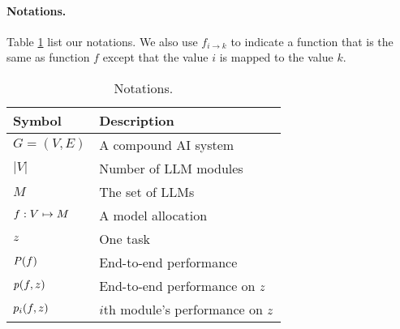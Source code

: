 \paragraph{Notations.} Table \ref{tab:deluxeagent:notation} list our notations. We also use $f_{i\rightarrow k}$ to indicate a function that is the same as function $f$ except that the value $i$ is mapped to the value $k$. 


\begin{table}[ht!]
\centering
\caption{Notations. 
}
\begin{tabular}{@{}ll@{}}
\toprule
\textbf{Symbol} & \textbf{Description} \\ \midrule
$G = (V, E)$   & A compound AI system \\ \midrule
$|V|$            & Number of LLM modules \\ \midrule
$M$            & The set of LLMs \\ \midrule
$f:V\mapsto M$          & A model allocation  \\ \midrule
$z$          & One task \\ \midrule
$\mathit{P}(f)$            & End-to-end performance \\ \midrule
$\mathit{p}(f,z)$            & End-to-end performance on $z$\\ \midrule
$p_i(f, z)$    & $i$th module's performance on $z$ \\
\bottomrule
\end{tabular}
\label{tab:deluxeagent:notation}
\end{table}